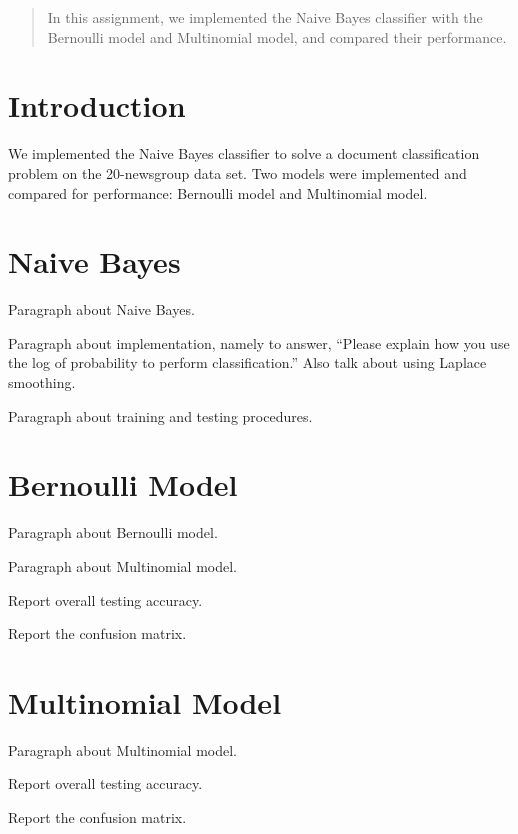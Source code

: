 \documentclass[12pt]{article}
\begin{document}
\maketitle

\begin{abstract}
In this assignment, we implemented the Naive Bayes classifier with the Bernoulli model and Multinomial model, and compared their performance.
\end{abstract}

\section{Introduction}
We implemented the Naive Bayes classifier to solve a document classification problem on the 20-newsgroup data set. Two models were implemented and compared for performance: Bernoulli model and Multinomial model.

\section{Naive Bayes}
Paragraph about Naive Bayes.

Paragraph about implementation, namely to answer, ``Please explain how you use the log of probability to perform classification.'' Also talk about using Laplace smoothing.

Paragraph about training and testing procedures.

\section{Bernoulli Model}
Paragraph about Bernoulli model.

Paragraph about Multinomial model.

Report overall testing accuracy.

Report the confusion matrix.

%

\section{Multinomial Model}

Paragraph about Multinomial model.

Report overall testing accuracy.

Report the confusion matrix.
\end{document}
